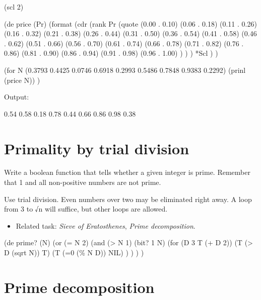 \begin{wideverbatim}

(scl 2)

(de price (Pr)
   (format
      (cdr
         (rank Pr
            (quote
               (0.00 . 0.10)
               (0.06 . 0.18)
               (0.11 . 0.26)
               (0.16 . 0.32)
               (0.21 . 0.38)
               (0.26 . 0.44)
               (0.31 . 0.50)
               (0.36 . 0.54)
               (0.41 . 0.58)
               (0.46 . 0.62)
               (0.51 . 0.66)
               (0.56 . 0.70)
               (0.61 . 0.74)
               (0.66 . 0.78)
               (0.71 . 0.82)
               (0.76 . 0.86)
               (0.81 . 0.90)
               (0.86 . 0.94)
               (0.91 . 0.98)
               (0.96 . 1.00) ) ) )
      *Scl ) )

(for N (0.3793 0.4425 0.0746 0.6918 0.2993 0.5486 0.7848 0.9383 0.2292)
   (prinl (price N)) )

Output:

0.54
0.58
0.18
0.78
0.44
0.66
0.86
0.98
0.38

\end{wideverbatim}

\pagebreak{}
\section*{Primality by trial division}

Write a boolean function that tells whether a given integer is prime.
Remember that 1 and all non-positive numbers are not prime.

Use trial division. Even numbers over two may be eliminated right away.
A loop from 3 to √n will suffice, but other loops are allowed.

\begin{itemize}
\item Related task: \emph{Sieve of Eratosthenes}, \emph{Prime
    decomposition}.
\end{itemize}

\begin{wideverbatim}

(de prime? (N)
   (or
      (= N 2)
      (and
         (> N 1)
         (bit? 1 N)
         (for (D 3  T  (+ D 2))
            (T (> D (sqrt N)) T)
            (T (=0 (\% N D)) NIL) ) ) ) )

\end{wideverbatim}

\pagebreak{}
\section*{Prime decomposition}

